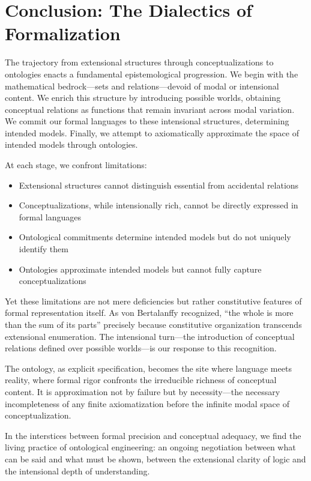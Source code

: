 \section{Conclusion: The Dialectics of Formalization}

The trajectory from extensional structures through conceptualizations to ontologies enacts a fundamental epistemological progression. We begin with the mathematical bedrock—sets and relations—devoid of modal or intensional content. We enrich this structure by introducing possible worlds, obtaining conceptual relations as functions that remain invariant across modal variation. We commit our formal languages to these intensional structures, determining intended models. Finally, we attempt to axiomatically approximate the space of intended models through ontologies.

At each stage, we confront limitations:
\begin{itemize}
	\item Extensional structures cannot distinguish essential from accidental relations
	\item Conceptualizations, while intensionally rich, cannot be directly expressed in formal languages
	\item Ontological commitments determine intended models but do not uniquely identify them
	\item Ontologies approximate intended models but cannot fully capture conceptualizations
\end{itemize}

Yet these limitations are not mere deficiencies but rather constitutive features of formal representation itself. As von Bertalanffy recognized, ``the whole is more than the sum of its parts'' precisely because constitutive organization transcends extensional enumeration. The intensional turn—the introduction of conceptual relations defined over possible worlds—is our response to this recognition.

The ontology, as explicit specification, becomes the site where language meets reality, where formal rigor confronts the irreducible richness of conceptual content. It is approximation not by failure but by necessity—the necessary incompleteness of any finite axiomatization before the infinite modal space of conceptualization.

In the interstices between formal precision and conceptual adequacy, we find the living practice of ontological engineering: an ongoing negotiation between what can be said and what must be shown, between the extensional clarity of logic and the intensional depth of understanding.